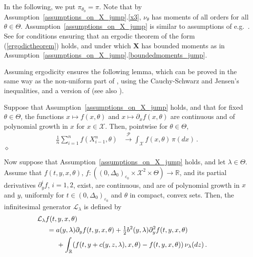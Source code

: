 \documentclass[11pt,a4paper]{article}
\newcommand{\xtl}{{X^n_{i-1}}}
\newcommand{\thetan}{{\theta_0}}
\newcommand{\RR}{{\mathbb R}}
\newcommand{\X}{{\mathbf X}}
\renewcommand{\ll}{{\mathcal{L}}}
\newcommand{\pp}{{\mathcal{P}}}
\newcommand{\xx}{{\mathcal{X}}}
\newcommand{\dqed}{{\leavevmode \unskip \penalty9999 \hbox{} \nobreak \hfill \quad \hbox{$\diamond$}}}
\numberwithin{equation}{section}
\numberwithin{theorem}{section}
\begin{document}
%
In the following, we put $\pi_\thetan = \pi$. Note that by Assumption~\ref{assumptions_on_X_jump}.\ref{x3}, $\nu_\theta$ has moments of all orders for all $\theta \in \Theta$. Assumption~\ref{assumptions_on_X_jump} is similar to assumptions of e.g.\ \cite{shimizu2006, ogihara2011, masuda2013}. See \cite{masuda2007, masuda2008} for conditions ensuring that an ergodic theorem of the form (\ref{ergodictheorem}) holds, and under which $\X$ has bounded moments as in Assumption~\ref{assumptions_on_X_jump}.\ref{boundedmoments_jump}.
\medskip

Assuming ergodicity ensures the following lemma, which can be proved in the same way as the non-uniform part of \cite[Lemma
8]{kessler1997}, using the Cauchy-Schwarz and Jensen's inequalities, and a version of \cite[Proposition 3.1]{shimizu2006} (see also \cite[p. 1598]{masuda2013}).
\begin{lemma}
Suppose that Assumption~\ref{assumptions_on_X_jump} holds, and that
for fixed $\theta \in \Theta$, the functions $x \mapsto f(x, \theta)$
and $x \mapsto \partial_x f(x,\theta)$ are continuous and of
polynomial growth in $x$ for $x\in\xx$. Then, pointwise for $\theta \in \Theta$,
%
\begin{align*}
\frac{1}{n} \sum_{i=1}^{n} f(\xtl, \theta) &\overset{\pp}{\longrightarrow}
\int_\xx f(x, \theta)\, \pi(dx)\,.
\end{align*}
\dqed
\label{ucp}
\end{lemma}
%
Now suppose that Assumption~\ref{assumptions_on_X_jump} holds, and let $\lambda \in \Theta$. Assume that $f(t,y,x,\theta)$, $f: ((0,\Delta_0)_{\varepsilon_0}\times \xx^2 \times \Theta) \to \RR$, and its partial derivatives $\partial^i_y f$, $i=1,2$, exist, are continuous, and are of polynomial growth in $x$ and $y$, uniformly for $t\in (0,\Delta_0)_{\varepsilon_0}$ and $\theta$ in compact, convex sets. Then, the infinitesimal generator $\ll_\lambda$ is defined by
\begin{align}
\begin{split}\label{infinitesimalgenerator2} 
&\hspace{-5mm} \ll_\lambda f(t,y,x, \theta) \\
&= a(y, \lambda)\partial_y f(t,y,x, \theta)+ \tfrac{1}{2} b^2(y,
\lambda)\partial^2_y f(t,y,x, \theta) \\
&\hspace{5mm} + \int_\RR (f(t,y+ c(y,z, \lambda),x, \theta) - f(t,y,x,
\theta))\, \nu_\lambda(dz)\,.
\end{split}
\end{align}
\end{document}
